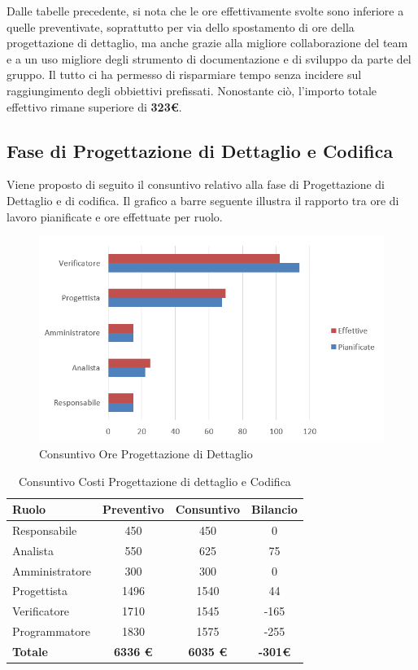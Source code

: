\documentclass[a4paper,11pt]{article}
\begin{document}
		Dalle tabelle precedente, si nota che le ore effettivamente svolte sono inferiore a quelle preventivate, soprattutto per via dello spostamento di ore della progettazione di dettaglio, ma anche grazie alla migliore collaborazione del team e a un uso migliore degli strumento di documentazione e di sviluppo da parte del gruppo. Il tutto ci ha permesso di risparmiare tempo senza incidere sul raggiungimento degli obbiettivi prefissati. Nonostante ciò, l'importo totale effettivo rimane superiore di \textbf{323\euro}.
	
		\newpage
	
		\subsection{Fase di Progettazione di Dettaglio e Codifica}
	Viene proposto di seguito il consuntivo relativo alla fase di Progettazione di Dettaglio e di codifica. Il grafico a barre seguente illustra il rapporto tra ore di lavoro pianificate e ore effettuate per ruolo. 	
	
	\begin{figure}[h!]
		\centering
		\includegraphics[scale=0.7]{../Images/chart-Consuntivo_Ore_Prog_Det_Cod}
	\caption{Consuntivo Ore Progettazione di Dettaglio}
	\end{figure}
	
	\begin{table}[h!]
	\begin{center}
		\begin{tabular}{l c c c}
			\textbf{Ruolo} & \textbf{Preventivo} & \textbf{Consuntivo} &\textbf{Bilancio}\\
			\midrule 
			Responsabile 	& 450 	& 450	& 0		\\
			Analista 		& 550 	& 625	& 75	\\
			Amministratore 	& 300 	& 300	& 0		\\			
			Progettista 	& 1496 	& 1540	& 44 	\\
			Verificatore 	& 1710 	& 1545	& -165	\\
			Programmatore	& 1830	& 1575  & -255	\\
			\midrule
			\textbf{Totale} & \textbf{6336 \euro} & \textbf{ 6035 \euro}	& \textbf{ -301\euro}
		\end{tabular}
		\end{center}
	\caption{Consuntivo Costi Progettazione di dettaglio e Codifica}
	\end{table}
	
\end{document}
